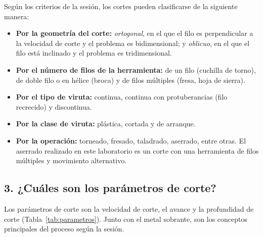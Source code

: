 \documentclass[12pt,a4paper]{article}
\begin{document}
Según los criterios de la sesión, los cortes pueden clasificarse de la siguiente
manera:

\begin{itemize}
	\item \textbf{Por la geometría del corte:} \emph{ortogonal}, en el que el filo
	      es perpendicular a la velocidad de corte y el problema es
	      bidimensional; y \emph{oblicuo}, en el que el filo está inclinado y el
	      problema es tridimensional.\\[-10pt]
	\item \textbf{Por el número de filos de la herramienta:} de un filo
	      (cuchilla de torno), de doble filo o en hélice (broca) y de filos
	      múltiples (fresa, hoja de sierra).\\[-10pt]
	\item \textbf{Por el tipo de viruta:} continua, continua con protuberancias
	      (filo recrecido) y discontinua.\\[-10pt]
	\item \textbf{Por la clase de viruta:} plástica, cortada y de
	      arranque.\\[-10pt]
	\item \textbf{Por la operación:} torneado, fresado, taladrado, aserrado, entre
	      otras. El aserrado realizado en este laboratorio es un corte con una
	      herramienta de filos múltiples y movimiento alternativo.
\end{itemize}

\subsection*{3. ¿Cuáles son los parámetros de corte?}

Los parámetros de corte son la velocidad de corte, el avance y la profundidad de
corte (Tabla~\ref{tab:parametros}). Junto con el metal sobrante, son los
conceptos principales del proceso según la sesión.
\end{document}
